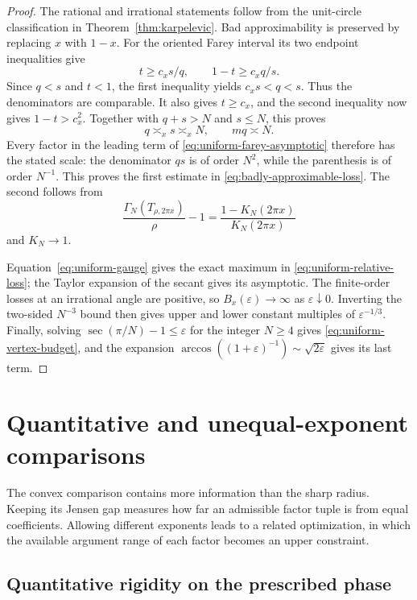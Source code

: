 \documentclass[11pt,a4paper]{article}
\theoremstyle{definition}
\theoremstyle{remark}
\numberwithin{equation}{section}
\begin{document}
\begin{proof}
The rational and irrational statements follow from the unit-circle
classification in Theorem~\ref{thm:karpelevic}.  Bad approximability
is preserved by replacing $x$ with $1-x$.  For the oriented Farey
interval its two endpoint inequalities give
\[
 t\ge c_xs/q,\qquad 1-t\ge c_xq/s.
\]
Since $q<s$ and $t<1$, the first inequality yields
$c_xs<q<s$.  Thus the denominators are comparable.  It also gives
$t\ge c_x$, and the second inequality now gives $1-t>c_x^2$.
Together with $q+s>N$ and $s\le N$, this proves
\[
 q\asymp_x s\asymp_x N,\qquad mq\asymp N.
\]
Every factor in the leading term of
\eqref{eq:uniform-farey-asymptotic} therefore has the stated scale:
the denominator $qs$ is of order $N^2$, while the parenthesis is of
order $N^{-1}$.  This proves the first estimate in
\eqref{eq:badly-approximable-loss}.  The second follows from
\[
 \frac{\Gamma_N(T_{\rho,2\pi x})}{\rho}-1
 =\frac{1-K_N(2\pi x)}{K_N(2\pi x)}
\]
and $K_N\to1$.

Equation~\eqref{eq:uniform-gauge} gives the exact maximum in
\eqref{eq:uniform-relative-loss}; the Taylor expansion of the secant
gives its asymptotic.  The finite-order losses at an irrational angle
are positive, so $B_x(\varepsilon)\to\infty$ as
$\varepsilon\downarrow0$.  Inverting the two-sided $N^{-3}$ bound
then gives upper and lower constant multiples of $\varepsilon^{-1/3}$.
Finally, solving $\sec(\pi/N)-1\le\varepsilon$ for the integer
$N\ge4$ gives \eqref{eq:uniform-vertex-budget}, and the expansion
$\arccos((1+\varepsilon)^{-1})\sim\sqrt{2\varepsilon}$ gives its
last term.
\end{proof}


\clearpage
\appendix
\section{Quantitative and unequal-exponent comparisons}
\label{app:comparisons}

The convex comparison contains more information than the sharp radius.
Keeping its Jensen gap measures how far an admissible factor tuple is from
equal coefficients. Allowing different exponents leads to a related
optimization, in which the available argument range of each factor becomes
an upper constraint.

\subsection{Quantitative rigidity on the prescribed phase}
\end{document}
